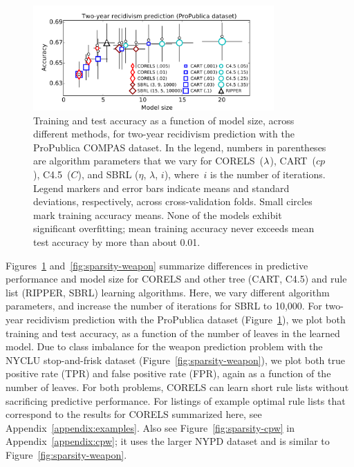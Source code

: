 \begin{figure}[t!]
\begin{center}
\includegraphics[trim={12mm, 5mm, 24mm, 5mm},
width=0.82\textwidth]{figs/compas-sparsity-training.pdf}

\end{center}
\caption{Training and test accuracy as a function of model size, across different methods,
for two-year recidivism prediction with the ProPublica COMPAS dataset.
%
In the legend, numbers in parentheses are algorithm parameters that we vary
for CORELS~(${\lambda}$), CART~($cp$), C4.5~($C$), and SBRL ($\eta$, $\lambda$, $i$),
where~$i$ is the number of iterations.
%
Legend markers and error bars indicate means and standard deviations,
respectively, across cross-validation folds.
%
Small circles mark training accuracy means.
%
None of the models exhibit significant overfitting;
mean training accuracy never exceeds mean test accuracy
by more than about 0.01.
}
\label{fig:sparsity-compas}
\end{figure}

Figures~\ref{fig:sparsity-compas} and~\ref{fig:sparsity-weapon} summarize differences
in predictive performance and model size
for CORELS and other tree (CART, C4.5) and rule list (RIPPER, SBRL) learning algorithms.
%
Here, we vary different algorithm parameters, and increase the number of iterations for SBRL to 10,000.
%
For two-year recidivism prediction with the ProPublica dataset (Figure~\ref{fig:sparsity-compas}),
we plot both training and test accuracy,
as a function of the number of leaves in the learned model.
%
Due to class imbalance for the weapon prediction problem with the NYCLU stop-and-frisk dataset
(Figure~\ref{fig:sparsity-weapon}), we plot both true positive rate (TPR) and false positive rate (FPR),
again as a function of the number of leaves.
%
For both problems, CORELS can learn short rule lists without sacrificing predictive performance.
%
For listings of example optimal rule lists that correspond to the results
for CORELS summarized here, see Appendix~\ref{appendix:examples}.
%
Also see Figure~\ref{fig:sparsity-cpw} in Appendix~\ref{appendix:cpw}; it uses the larger
NYPD dataset and is similar to Figure~\ref{fig:sparsity-weapon}.

